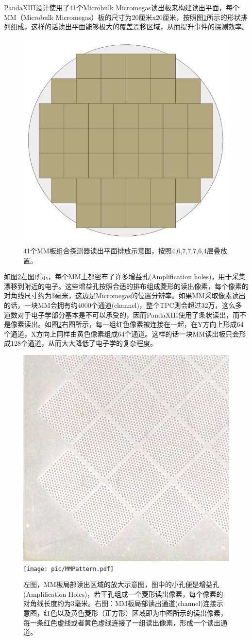 PandaXIII设计使用了41个Microbulk Micromegas读出板来构建读出平面，每个MM（Microbulk Micromegas）板的尺寸为20厘米x20厘米，按照图\ref{fig:mms}所示的形状排列组成，这样的话读出平面能够极大的覆盖漂移区域，从而提升事件的探测效率。

\begin{figure}[hbt]
    \centering
    \includegraphics[width=0.4\columnwidth]{pic/fig8.png}
    \caption{41个MM板组合探测器读出平面排放示意图，按照4,6,7,7,7,6,4层叠放置。}
    \label{fig:mms}
\end{figure}

如图\ref{fig:mm_detail}左图所示，每个MM上都密布了许多增益孔(Amplification holes)，用于采集漂移到附近的电子。这些增益孔按照合适的排布组成菱形的读出像素，每个像素的对角线尺寸约为3毫米，这边是Micromegas的位置分辨率。如果MM采取像素读出的话，一块MM会拥有约4000个通道(channel)，整个TPC则会超过32万，这么多道数对于电子学部分基本是不可以承受的，因而PandaXIII使用了条状读出，而不是像素读出。如图\ref{fig:mm_detail}右图所示，每一组红色像素被连接在一起，在Y方向上形成64个通道，X方向上同样由黄色像素组成64个通道。这样的话一块MM读出板只会形成128个通道，从而大大降低了电子学的复杂程度。

\begin{figure}
    \centering
    \includegraphics[width=0.4\columnwidth]{pic/MMStrips.jpg}
    \texttt{[image: pic/MMPattern.pdf]}
    \caption{左图，MM板局部读出区域的放大示意图，图中的小孔便是增益孔(Amplification Holes)，若干孔组成一个菱形读出像素，每个像素的对角线长度约为3毫米。右图：MM板局部读出通道(channel)连接示意图，红色以及黄色菱形（正方形）区域即为中图所示的读出像素，每一条红色虚线或者黄色虚线连接了一组读出像素，形成一个读出通道。\supercite{lin2018design}}
    \label{fig:mm_detail}
\end{figure}

